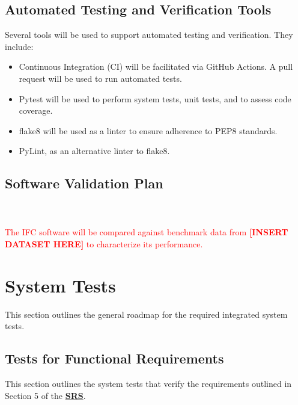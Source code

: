 \documentclass[12pt, titlepage]{article}
\begin{document}
\subsection{Automated Testing and Verification Tools}
Several tools will be used to support automated testing and verification. They include:
\begin{itemize}
\item Continuous Integration (CI) will be facilitated via GitHub Actions. A pull request will be used 
to run automated tests.
\item Pytest will be used to perform system tests, unit tests, and to assess code coverage. 
\item flake8 will be used as a linter to ensure adherence to PEP8 standards. 
\item PyLint, as an alternative linter to flake8.
\end{itemize}

\subsection{Software Validation Plan}
\\ \\

\textcolor{red}{The IFC software will be compared against benchmark data from \textbf{[INSERT DATASET HERE]} 
to characterize its performance.}


\section{System Tests}\label{Sys_Tests}
This section outlines the general roadmap for the required integrated system tests. 
\subsection{Tests for Functional Requirements} \label{FR_Tests}
This section outlines the system tests that verify the requirements outlined in 
Section 5 of the 
\textbf{\href{https://github.com/KiranSingh15/CAS-741-Image-Correspondences/blob/main/docs/SRS/SRS.pdf}
{SRS}}. 
\end{document}
